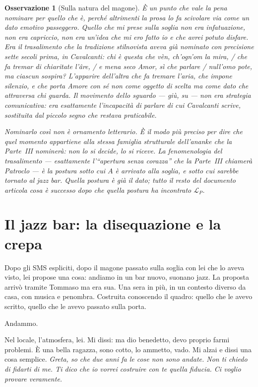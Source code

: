\documentclass[
    oneside,                 %
    openany,                 %
    titlepage,
    11pt,
    a4paper,
    italian,
    DIV=14,                  %
    headinclude,
    footinclude=true,
    cleardoublepage=empty
]{scrbook}
\theoremstyle{ctplain}
\theoremstyle{ctdef}
\theoremstyle{ctrem}
\newtheorem*{oss}{Osservazione}
\newcommand{\LP}{\mathcal{L}_P}
\begin{document}
\begin{oss}[Sulla natura del magone]
È un punto che vale la pena nominare per quello che è, perché altrimenti la prosa lo fa scivolare via come un dato emotivo passeggero. Quello che mi prese sulla soglia non era infatuazione, non era capriccio, non era un'idea che mi ero fatto io e che avrei potuto disfare. Era il \emph{trasalimento} che la tradizione stilnovista aveva già nominato con precisione sette secoli prima, in Cavalcanti: \emph{chi è questa che vèn, ch'ogn'om la mira, / che fa tremar di chiaritate l'âre, / e mena seco Amor, sì che parlare / null'omo pote, ma ciascun sospira?} L'apparire dell'altra che fa tremare l'aria, che impone silenzio, e che porta Amore con sé non come oggetto di scelta ma come dato che attraversa chi guarda. Il movimento dello sguardo --- giù, su --- non era strategia comunicativa: era esattamente l'incapacità di parlare di cui Cavalcanti scrive, sostituita dal piccolo segno che restava praticabile.

Nominarlo così non è ornamento letterario. È il modo più preciso per dire che quel momento appartiene alla stessa famiglia strutturale dell'ananke che la Parte~III nominerà: non lo si decide, lo si riceve. La fenomenologia del trasalimento --- esattamente l'``apertura senza corazza'' che la Parte~III chiamerà Patroclo --- è la postura sotto cui $A$ è arrivato alla soglia, e sotto cui sarebbe tornato al jazz bar. Quella postura è già il dato; tutto il resto del documento articola cosa è successo dopo che quella postura ha incontrato $\LP$.
\end{oss}

\chapter[Il jazz bar]{Il jazz bar: la disequazione e la crepa}

Dopo gli SMS espliciti, dopo il magone passato sulla soglia con lei che lo aveva visto, lei propose una cosa: andiamo in un bar nuovo, suonano jazz. La proposta arrivò tramite Tommaso ma era sua. Una sera in più, in un contesto diverso da casa, con musica e penombra. Costruita conoscendo il quadro: quello che le avevo scritto, quello che le avevo passato sulla porta.

Andammo.

Nel locale, l'atmosfera, lei. Mi dissi: ma dio benedetto, devo proprio farmi problemi. È una bella ragazza, sono cotto, lo ammetto, vado. Mi alzai e dissi una cosa semplice. \emph{Greta, so che due anni fa le cose non sono andate. Non ti chiedo di fidarti di me. Ti dico che io vorrei costruire con te quella fiducia. Ci voglio provare veramente.}
\end{document}
